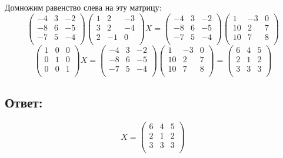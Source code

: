 \documentclass[a4paper]{article}
\begin{document}
Домножим равенство слева на эту матрицу:
\begin{equation*}
\begin{pmatrix}
-4 & 3 & -2 \\
-8 & 6 & -5 \\
-7 & 5 & -4 \\
\end{pmatrix}
\begin{pmatrix}
1 & 2 & -3 \\
3 & 2 & -4 \\
2 & -1 & 0 \\
\end{pmatrix}
X = 
\begin{pmatrix}
-4 & 3 & -2 \\
-8 & 6 & -5 \\
-7 & 5 & -4 \\
\end{pmatrix}
\begin{pmatrix}
1 & -3 & 0 \\
10 & 2 & 7 \\
10 & 7 & 8 \\
\end{pmatrix}
\end{equation*}
\begin{equation*}
\begin{pmatrix}
1 & 0 & 0 \\
0 & 1 & 0 \\
0 & 0 & 1 \\
\end{pmatrix}
X = 
\begin{pmatrix}
-4 & 3 & -2 \\
-8 & 6 & -5 \\
-7 & 5 & -4 \\
\end{pmatrix}
\begin{pmatrix}
1 & -3 & 0 \\
10 & 2 & 7 \\
10 & 7 & 8 \\
\end{pmatrix} = 
\begin{pmatrix}
6 & 4 & 5 \\
2 & 1 & 2 \\
3 & 3 & 3 \\
\end{pmatrix}
\end{equation*}

\subsection*{Ответ:}
\begin{equation*}
X = 
\begin{pmatrix}
6 & 4 & 5 \\
2 & 1 & 2 \\
3 & 3 & 3 \\
\end{pmatrix}
\end{equation*}
\end{document}
